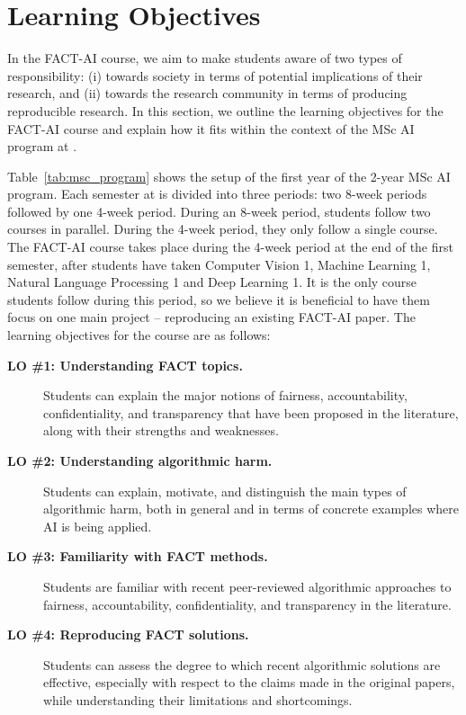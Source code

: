 
\section{Learning Objectives}
\label{section:learning-objectives}

In the FACT-AI course, we aim to make students aware of two types of responsibility: (i) towards society in terms of potential implications of their research, and (ii) towards the research community in terms of producing reproducible research. 
In this section, we outline the learning objectives for the FACT-AI course and explain how it fits within the context of the MSc AI program at \OurUniversity{}. 

Table~\ref{tab:msc_program} shows the setup of the first year of the 2-year MSc AI program. Each semester at \OurUniversity{} is divided into three periods: two 8-week periods followed by one 4-week period. During an 8-week period, students follow two courses in parallel. During the 4-week period, they only follow a single course. 
The FACT-AI course takes place during the 4-week period at the end of the first semester, after students have taken Computer Vision 1, Machine Learning 1, Natural Language Processing 1 and Deep Learning 1. 
It is the only course students follow during this period, so we believe it is beneficial to have them focus on one main project -- reproducing an existing FACT-AI paper. 
The learning objectives for the course are as follows: 
\begin{description}
	\item[\textbf{LO \#1: Understanding FACT topics.}] Students can explain the major notions of fairness, accountability, confidentiality, and transparency that have been proposed in the literature, along with their strengths and weaknesses.
	\item[\textbf{LO \#2: Understanding algorithmic harm.}] Students can explain, motivate, and distinguish the main types of algorithmic harm, both in general and in terms of concrete examples where AI is being applied.
	\item[\textbf{LO \#3: Familiarity with FACT methods.}] Students are familiar with recent peer-reviewed algorithmic approaches to fairness, accountability, confidentiality, and transparency in the literature. 
    \item[\textbf{LO \#4: Reproducing FACT solutions.}] Students can assess the degree to which recent algorithmic solutions are effective, especially with respect to the claims made in the original papers, while understanding their limitations and shortcomings. 
\end{description}
